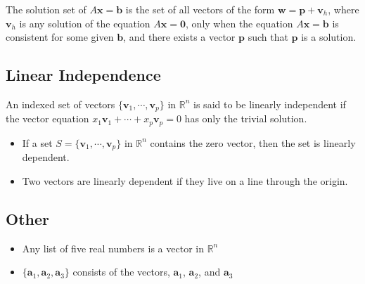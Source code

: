 \documentclass{article}
\begin{document}
The solution set of $A\mathbf{x}=\mathbf{b}$ is the set of all vectors of the form
$\mathbf{w}=\mathbf{p}+\mathbf{v}_h$, where $\mathbf{v}_h$ is any solution of the equation
$A\mathbf{x}=\mathbf{0}$, only when the equation $A\mathbf{x}=\mathbf{b}$ is consistent for some
given $\mathbf{b}$, and there exists a vector $\mathbf{p}$ such that $\mathbf{p}$ is a solution.

\subsection*{Linear Independence}
An indexed set of vectors $\{\mathbf{v}_1,\cdots,\mathbf{v}_p\}$ in $\mathbb{R}^n$ is said to be linearly independent if the vector equation $x_1\mathbf{v}_1+\cdots + x_p\mathbf{v}_p=0$ has only the trivial solution.
\begin{itemize}
    \item If a set $S=\{\mathbf{v}_1,\cdots, \mathbf{v}_p\}$ in $\mathbb{R}^n$ contains the zero vector, then the set is linearly dependent.
    \item Two vectors are linearly dependent if they live on a line through the origin.
\end{itemize}

\subsection*{Other}
\begin{itemize}
    \item Any list of five real numbers is a vector in $\mathbb{R}^n$
    \item $\{\mathbf{a}_1, \mathbf{a}_2, \mathbf{a}_3\}$ consists of the vectors, $\mathbf{a}_1$,
    $\mathbf{a}_2$, and $\mathbf{a}_3$
\end{itemize}
\end{document}
